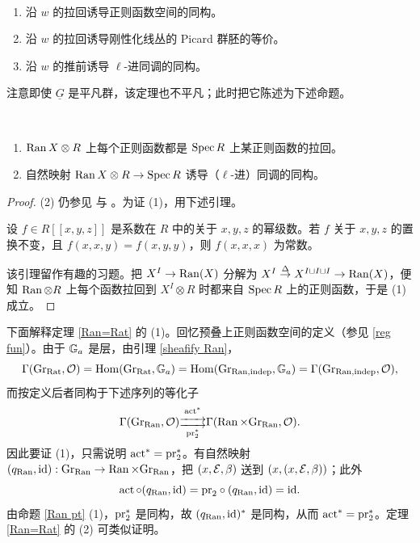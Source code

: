 \begin{thm}\label{Ran=Rat}~
\begin{enumerate}
\item[(1)] 沿 $w$ 的拉回诱导正则函数空间的同构。
\item[(2)] 沿 $w$ 的拉回诱导刚性化线丛的 Picard 群胚的等价。
\item[(3)] 沿 $w$ 的推前诱导 $\ell$-进同调的同构。
\end{enumerate}
\end{thm}

注意即使 $\underline G$ 是平凡群，该定理也不平凡；此时把它陈述为下述命题。

\begin{prop}\label{Ran pt}~
\begin{enumerate}
\item[(1)] $\Ran X\otimes R$ 上每个正则函数都是 $\Spec R$ 上某正则函数的拉回。
\item[(2)] 自然映射 $\Ran X\otimes R\to \Spec R$ 诱导（$\ell$-进）同调的同构。
\end{enumerate}
\end{prop}

\begin{proof}
(2) 仍参见 \cite{Ga3} 与 \cite[\S~2]{GL}。为证 (1)，用下述引理。
\begin{lem}
设 $f\in R[[x,y,z]]$ 是系数在 $R$ 中的关于 $x,y,z$ 的幂级数。若 $f$ 关于 $x,y,z$ 的置换不变，且 $f(x,x,y)=f(x,y,y)$，则 $f(x,x,x)$ 为常数。
\end{lem}
该引理留作有趣的习题。把 $X^I\to \Ran(X)$ 分解为 $X^I\stackrel{\Delta}{\to} X^{I\sqcup I\sqcup I}\to \Ran(X)$，便知 $\Ran\otimes R$ 上每个函数拉回到 $X^I\otimes R$ 时都来自 $\Spec R$ 上的正则函数，于是 (1) 成立。
\end{proof}

下面解释定理 \ref{Ran=Rat} 的 (1)。回忆预叠上正则函数空间的定义（参见 \eqref{reg fun}）。由于 $\bG_a$ 是层，由引理 \ref{sheafify Ran}，
\[\Gamma(\Gr_{\Rat},\mO)=\Hom(\Gr_{\Rat},\bG_a)=\Hom(\Gr_{\Ran,\on{indep}},\bG_a)=\Gamma(\Gr_{\Ran,\on{indep}},\mO),\]
而按定义后者同构于下述序列的等化子
\[\Gamma(\Gr_{\Ran},\mO)\substack{\on{act}^*\\  \xrightarrow{\hspace*{.6cm}}\\[-0.6ex] \xrightarrow{\hspace*{.6cm}} \\ \pr_2^*} \Gamma(\Ran\times \Gr_{\Ran},\mO).\]
因此要证 (1)，只需说明 $\on{act}^*=\pr_2^*$。有自然映射 $(q_{\Ran},\id):\Gr_{\Ran}\to \Ran\times\Gr_{\Ran}$，把 $(x,\mE,\beta)$ 送到 $(x,(x,\mE,\beta))$；此外
\[ \on{act}\circ(q_{\Ran},\id)=\pr_2\circ(q_{\Ran},\id)=\id.\]
由命题 \ref{Ran pt} (1)，$\pr_2^*$ 是同构，故 $(q_{\Ran},\id)^*$ 是同构，从而 $\on{act}^*=\pr_2^*$。定理 \ref{Ran=Rat} 的 (2) 可类似证明。


